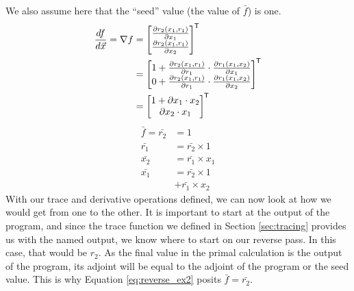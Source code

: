     We also assume here that the ``seed'' value (the value of $\bar{f}$) is one.
    \begin{equation} \label{eq:reverse_ex}
        \begin{aligned}
            \frac{df}{d\vec{x}}=\nabla f&=\begin{bmatrix}
                \frac{\partial r_2(x_1,r_1)}{\partial x_1}\\
                \frac{\partial r_2(x_1,r_1)}{\partial x_2}
            \end{bmatrix}^{\mkern-1.5mu\mathsf{T}}\\
            &=\begin{bmatrix}
                1+\frac{\partial r_2(x_1,r_1)}{\partial r_1}\cdot\frac{\partial r_1(x_1,x_2)}{\partial x_1}\\
                0+\frac{\partial r_2(x_1,r_1)}{\partial r_1}\cdot\frac{\partial r_1(x_1,x_2)}{\partial x_2}
            \end{bmatrix}^{\mkern-1.5mu\mathsf{T}}\\
            &=\begin{bmatrix}
                1+\partial x_1\cdot x_2\\
                \partial x_2\cdot x_1
            \end{bmatrix}^{\mkern-1.5mu\mathsf{T}}
        \end{aligned}
    \end{equation}
    \begin{equation} \label{eq:reverse_ex2}
        \begin{aligned}
            \bar{f}=\bar{r_2}&=1\\
            \bar{r_1}&=\bar{r_2}\times1\\
            \bar{x_2}&=\bar{r_1}\times x_1\\
            \bar{x_1}&=\bar{r_2}\times1\\
            &+\bar{r_1}\times x_2
        \end{aligned}
    \end{equation}
    With our trace and derivative operations defined, we can now look at how we would get from one to the other.
    It is important to start at the output of the program, and since the trace function we defined in Section \ref{sec:tracing} provides us with the named output, we know where to start on our reverse pass.
    In this case, that would be $r_2$.
    As the final value in the primal calculation is the output of the program, its adjoint will be equal to the adjoint of the program or the seed value.
    This is why Equation \ref{eq:reverse_ex2} posits $\bar{f}=\bar{r_2}$.

